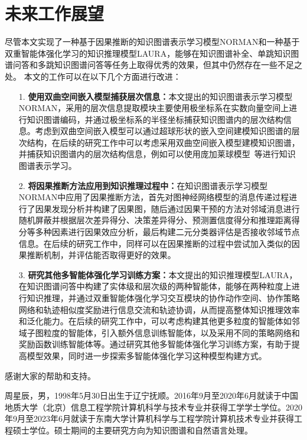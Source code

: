 \documentclass[algorithmlist, AutoFakeBold, AutoFakeSlant, figurelist, tablelist, nomlist, masters]{seuthesix}
\begin{document}
\section{未来工作展望}
尽管本文实现了一种基于因果推断的知识图谱表示学习模型NORMAN和一种基于双重智能体强化学习的知识推理模型LAURA，能够在知识图谱补全、单跳知识图谱问答和多跳知识图谱问答等任务上取得优秀的效果，但其中仍然存在一些不足之处。
本文的工作可以在以下几个方面进行改进：
\begin{itemize}
  \item [1.]\textbf{使用双曲空间嵌入模型捕获层次信息：}本文提出的知识图谱表示学习模型NORMAN，采用的层次信息提取模块主要使用极坐标系在实数向量空间上进行知识图谱编码，并通过极坐标系的半径坐标捕获知识图谱内的层次结构信息。考虑到双曲空间嵌入模型可以通过超球形状的嵌入空间建模知识图谱的层次结构，在后续的研究工作中可以考虑采用双曲空间嵌入模型建模知识图谱，并捕获知识图谱内的层次结构信息，例如可以使用庞加莱球模型~\cite{abramowicz2002poincare}等进行知识图谱表示学习。
  \item [2.]\textbf{将因果推断方法应用到知识推理过程中：}在知识图谱表示学习模型NORMAN中应用了因果推断方法，首先对图神经网络模型的消息传递过程进行了因果发现分析并构建了因果图，随后通过因果干预的方法对邻域消息进行随机屏蔽并根据层次差异得分、决策差异得分、预测置信度得分和推理距离得分等多种因素进行因果效应分析，最后构建二元分类器评估是否接收邻域节点信息。在后续的研究工作中，同样可以在因果推断的过程中尝试加入类似的因果推断机制，并评估能否取得更好的效果。
  \item [3.]\textbf{研究其他多智能体强化学习训练方案：}本文提出的知识推理模型LAURA，在知识图谱问答中构建了实体级和层次级的两种智能体，能够在两种粒度上进行知识推理，并通过双重智能体强化学习交互模块的协作动作空间、协作策略网络和轨迹相似度奖励进行信息交流和轨迹协调，从而提高整体知识推理效率和泛化能力。在后续的研究工作中，可以考虑构建其他更多粒度的智能体如邻域子图粒度的智能体，引入额外信息训练智能体，以及采用不同的策略网络和奖励函数训练智能体等。通过研究其他多智能体强化学习训练方案，有助于提高模型效果，同时进一步探索多智能体强化学习这种模型构建方式。
\end{itemize}

\acknowledgement
感谢大家的帮助和支持。


% 
% 
% 


\appendix
{}
周星辰，男，1998年5月30日出生于辽宁抚顺。2016年9月至2020年6月就读于中国地质大学（北京）信息工程学院计算机科学与技术专业并获得工学学士学位。2020年9月至2023年6月就读于东南大学计算机科学与工程学院计算机技术专业并获得工程硕士学位。硕士期间的主要研究方向为知识图谱和自然语言处理。
\end{document}
